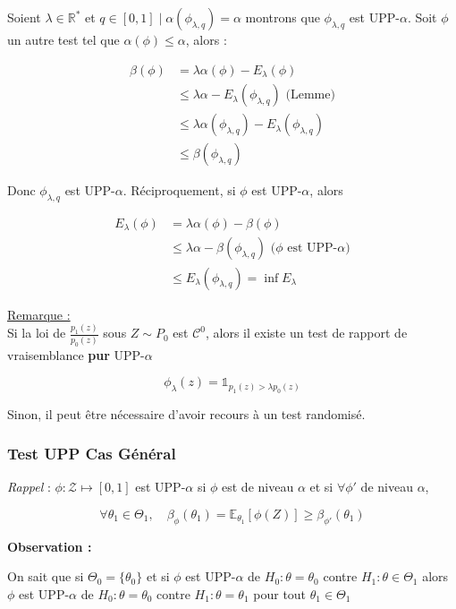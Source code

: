 \documentclass[12pt]{article}
\newcommand{\espace}{\vspace{1.5em}}
\newcommand{\petitespace}{\vspace{0.5cm}}
\newcommand{\cercler}[1]{\tikz[baseline=(char.base)]{\node[shape=circle,draw,inner sep=1pt](char){#1};} }
\newcommand{\bb}[1]{\mathbb{#1}} %
\newcommand{\R}{\bb{R}} %
\newcommand{\Rq}{\underline{Remarque :} \\}
\renewcommand{\cal}{\mathcal}
\newcommand{\1}{\bb{1}} %
\begin{document}
{\cercler 2 Soient $\lambda \in \R^*$ et $q \in [0,1] \mid \alpha(\phi_{\lambda,q}) = \alpha$ montrons que $\phi_{\lambda,q}$ est UPP-$\alpha$. Soit $\phi$ un autre test tel que $\alpha(\phi)\le \alpha$, alors :


\begin{align*}
	\beta(\phi) &= \lambda \alpha(\phi)-E_\lambda(\phi) \\
	&\le \lambda \alpha-E_\lambda(\phi_{\lambda,q}) \text{ (Lemme)}\\
	&\le \lambda \alpha(\phi_{\lambda,q}) -E_\lambda(\phi_{\lambda,q}) \\
	&\le \beta(\phi_{\lambda,q})
\end{align*}

Donc $\phi_{\lambda,q}$ est UPP-$\alpha$. Réciproquement, si $\phi$ est UPP-$\alpha$, alors 

\begin{align*}
	E_\lambda(\phi)  &= \lambda \alpha(\phi)- \beta(\phi) \\
	& \le \lambda\alpha-\beta(\phi_{\lambda, q}) \text{ ($\phi$ est UPP-$\alpha$)}\\
	&\le E_\lambda(\phi_{\lambda, q}) = \inf E_\lambda
\end{align*}
 }

\Rq

Si la loi de $\frac{p_1(z)}{p_0(z)}$ sous $Z \sim P_0$ est $\cal C^0$, alors il existe un test de rapport de vraisemblance \textbf{pur} UPP-$\alpha$ 

$$\phi_\lambda(z) = \1_{p_1(z)>\lambda p_0(z)} $$

Sinon, il peut être nécessaire d'avoir recours à un test randomisé. \espace


 \subsubsection{Test UPP Cas Général}\espace

\textit{Rappel} : $\phi : \cal Z \mapsto [0,1]$ est UPP-$\alpha$ si $\phi$ est de niveau $\alpha$ et si $\forall \phi'$ de niveau $\alpha$, 

$$\forall \theta_1 \in \Theta_1, \quad \beta_\phi(\theta_1) = \bb{E}_{\theta_1}[\phi(Z)] \ge \beta_{\phi'}(\theta_1) $$


\textbf{Observation :}\petitespace



On sait que si $\Theta_0 =\{ \theta_0\}$ et si $\phi$ est UPP-$\alpha$ de $H_0 : \theta=\theta_0$ contre $H_1 : \theta \in \Theta_1$ alors $\phi$ est UPP-$\alpha$ de $H_0 : \theta=\theta_0$ contre $H_1 : \theta = \theta_1$  pour tout $\theta_1 \in \Theta_1$
\end{document}
